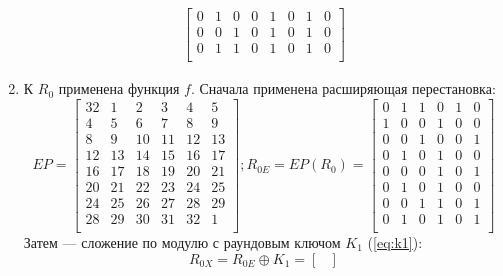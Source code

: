 \documentclass[a4paper, 14pt]{extarticle}
\begin{document}
\begin{enumerate}
\begin{equation}
\begin{array}{c}
\begin{bmatrix}
                0   & 1   & 0   & 0   & 1   & 0   & 1   & 0   \\
                0   & 0   & 1   & 0   & 1   & 0   & 1   & 0   \\
                0   & 1   & 1   & 0   & 1   & 0   & 1   & 0   \\
            \end{bmatrix}
        \end{array}
    \end{equation}
    \item К $R_0$ применена функция $f$. Сначала применена расширяющая перестановка:
    \begin{equation}\label{eq:start}
        EP = \begin{bmatrix}
            32  & 1   & 2   & 3   & 4   & 5   \\
            4   & 5   & 6   & 7   & 8   & 9   \\
            8   & 9   & 10  & 11  & 12  & 13  \\
            12  & 13  & 14  & 15  & 16  & 17  \\
            16  & 17  & 18  & 19  & 20  & 21  \\
            20  & 21  & 22  & 23  & 24  & 25  \\
            24  & 25  & 26  & 27  & 28  & 29  \\
            28  & 29  & 30  & 31  & 32  & 1   \\
        \end{bmatrix}; R_{0E} = EP(R_0) = \begin{bmatrix}
            0   & 1   & 1   & 0   & 1   & 0   \\
            1   & 0   & 0   & 1   & 0   & 0   \\
            0   & 0   & 1   & 0   & 0   & 1   \\
            0   & 1   & 0   & 1   & 0   & 0   \\
            0   & 0   & 0   & 1   & 0   & 1   \\
            0   & 1   & 0   & 1   & 0   & 0   \\
            0   & 0   & 1   & 1   & 0   & 1   \\
            0   & 1   & 0   & 1   & 0   & 1   \\
        \end{bmatrix}
    \end{equation}
    Затем --- сложение по модулю с раундовым ключом $K_1$ (\ref{eq:k1}):
    \begin{equation}
        R_{0X} = R_{0E} \oplus K_1 = \begin{bmatrix}

\end{bmatrix}
\end{equation}
\end{enumerate}
\end{document}
